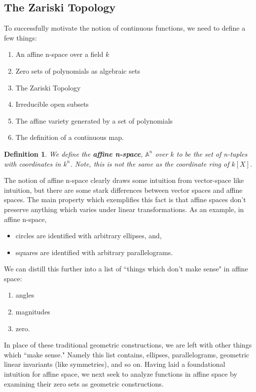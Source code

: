 \documentclass[12 pt]{article}        	%
\newtheorem{definition}{Definition}
\begin{document}
\subsection{The Zariski Topology}
To successfully motivate the notion of continuous functions, we need to define a few things:
\begin{enumerate}
    \item An affine n-space over a field $k$
    \item Zero sets of polynomials as algebraic sets
    \item The Zariski Topology
    \item Irreducible open subsets
    \item The affine variety generated by a set of polynomials
    \item The definition of a continuous map.
\end{enumerate}
\begin{definition}
    We define the \textbf{affine n-space}, $\mathbb{A}^n$ over $k$ to be the set of n-tuples with coordinates in $k^n$. Note, this is \textit{not} the same as the coordinate ring of $k[X]$. 
\end{definition}
The notion of affine n-space clearly draws some intuition from vector-space like intuition, but there are some stark differences between vector spaces and affine spaces. The main property which exemplifies this fact is that affine spaces don't preserve anything which varies under linear transformations. As an example, in affine n-space,
\begin{itemize}
    \item circles are identified with arbitrary ellipses, and,
    \item squares are identified with arbitrary parallelograms.
\end{itemize}
We can distill this further into a list of ``things which don't make sense" in affine space:
\begin{enumerate}
    \item angles
    \item magnitudes
    \item zero.
\end{enumerate}
In place of these traditional geometric constructions, we are left with other things which ``make sense." Namely this list contains, ellipses, parallelograms, geometric linear invariants (like symmetries), and so on. Having laid a foundational intuition for affine space, we next seek to analyze functions in affine space by examining their zero sets as geometric constructions.
\end{document}

